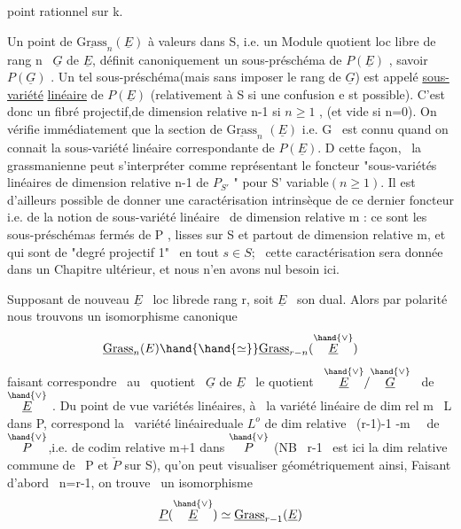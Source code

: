 
point rationnel sur k.

Un point de $\underline{\mathrm{Grass}}_n(\underline{E})$ à valeurs dans S, i.e. un Module quotient
loc libre de rang n \ $\underline{G}$ de $\underline{E}$, définit canoniquement un sous-préschéma
de $P(\underline{E})$ , savoir $P(\underline{G})$ . Un tel sous-préschéma(mais sans imposer le rang de $\underline{G}$) est appelé \uline{sous-variété}
\uline{linéaire} de $P(\underline{E})$ (relativement à S si une confusion e st possible).
C'est donc un fibré projectif,de dimension relative n-1 si $n\geqslant 1$ ,
(et vide si n=0). On vérifie immédiatement que la section de $\underline{\mathrm{Grass}}_n$
$(\underline{E})$ i.e. G \ est connu quand on connait la sous-variété linéaire
correspondante de $P(\underline{E})$. D cette façon, \ la grassmanienne peut
s'interpréter comme représentant le foncteur "sous-variétés linéaires
de dimension relative n-1  de $P_{S'}$ " pour S'
variable$(n\geqslant 1)$. Il est d'ailleurs possible de donner une caractérisation
intrinsèque de ce dernier foncteur i.e. de la notion de sous-variété
linéaire \ de dimension relative m : ce sont les sous-préschémas fermés
de P , lisses sur S et partout de dimension relative m, et qui sont
de "degré projectif 1" \ en tout $s\in S$; \ cette caractérisation sera
donnée dans un Chapitre ultérieur, et nous n'en avons nul besoin ici.

Supposant de nouveau $\underline{E}$ \ loc librede rang r, soit $\underline{E}$ \ son dual. Alors
par polarité nous trouvons un isomorphisme canonique
\[ \underline{\mathrm{Grass}}_n(E) \hand{\hand{\simeq}} \underline{\mathrm{Grass}}_{r-n}(\overset{\hand{\vee}}{\underline{E}}) \]
faisant correspondre \ au \ quotient \ $\underline{G}$ de $\underline{E}$ \ le quotient \ $\overset{\hand{\vee}}{\underline{E}}/\overset{\hand{\vee}}{\underline{G}}$ \ de $\overset{\hand{\vee}}{\underline{E}}$ .
Du point de vue variétés linéaires, à \ la variété linéaire de dim rel
m \ L dans P, correspond la \ variété linéaireduale $L^{o}$ de dim relative
 \ (r-1)-1 -m \ \ de $\overset{\hand{\vee}}{P}$,i.e. de codim relative m+1 dans $\overset{\hand{\vee}}{P}$ (NB \ r-1 \ est ici la dim relative
commune de \ P et $\check{P}$ sur S), qu'on peut visualiser géométriquement ainsi,
Faisant d'abord \ n=r-1, on trouve \ un isomorphisme
\[ \underline{P}(\overset{\hand{\vee}}{\underline{E}}) \simeq \underline{\mathrm{Grass}}_{r-1}(\underline{E}) \]

